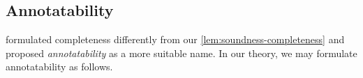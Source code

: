 %
%
%
%
%

\subsection{Annotatability}\label{sec:annotatability}
\citet[Section~3.2]{Dunfield2021} formulated completeness differently from our \cref{lem:soundness-completeness} and proposed \emph{annotatability} as a more suitable name.
In our theory, we may formulate annotatability as follows.

